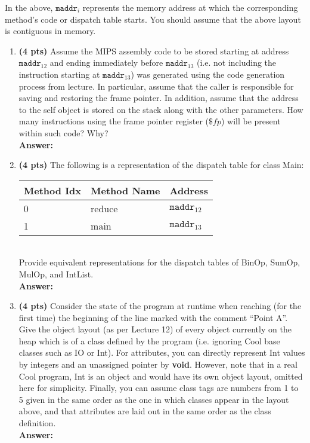 \documentclass[11pt]{article}
\begin{document}
\begin{enumerate}
  In the above, $\mathtt{maddr}_i$ represents the memory address at which the corresponding method's code or dispatch table starts. You should assume that the above layout is contiguous in memory.
  
  \begin{enumerate}
    \item \textbf{(4 pts)} Assume the MIPS assembly code to be stored starting at address $\mathtt{maddr}_{12}$ and ending immediately before $\mathtt{maddr}_{13}$ (i.e. not including the instruction starting at $\mathtt{maddr}_{13}$) was generated using the code generation process from lecture. In particular, assume that the caller is responsible for saving and restoring the frame pointer. In addition, assume that the address to the self object is stored on the stack along with the other parameters. How many instructions using the frame pointer register ($\$fp$) will be present within such code? Why?\\
    \textbf{Answer:} 
    
   \newpage
    \item \textbf{(4 pts)} The following is a representation of the dispatch table for class Main: \\
    
    \begin{tabular}{ | l | l | l | }
    \hline
    Method Idx & Method Name & Address \\
    \hline
    0 & reduce & $\mathtt{maddr}_{12}$ \\
    \hline
    1 & main & $\mathtt{maddr}_{13}$ \\
    \hline
    \end{tabular} \\
    
    Provide equivalent representations for the dispatch tables of BinOp, SumOp, MulOp, and IntList.\\
    \textbf{Answer:} 
    
   \newpage
    \item \textbf{(4 pts)} Consider the state of the program at runtime when reaching (for the first time) the beginning of the line marked with the comment ``Point A''. Give the object layout (as per Lecture 12) of every object currently on the heap which is of a class defined by the program (i.e. ignoring Cool base classes such as IO or Int). For attributes, you can directly represent Int values by integers and an unassigned pointer by \textbf{void}. However, note that in a real Cool program, Int is an object and would have its own object layout, omitted here for simplicity. Finally, you can assume class tags are numbers from 1 to 5 given in the same order as the one in which classes appear in the layout above, and that attributes are laid out in the same order as the class definition.\\
    \textbf{Answer:} 
    

\end{enumerate}
\end{enumerate}
\end{document}
